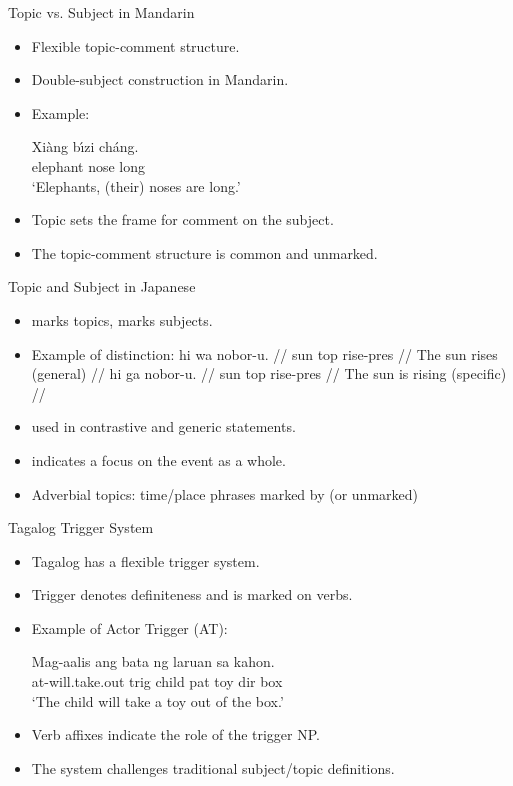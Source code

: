 \documentclass{beamer}
\begin{document}
\begin{frame}{Topic vs. Subject in Mandarin}
  \begin{itemize}
    \item Flexible topic-comment structure.
    \item Double-subject construction in Mandarin.
    \item Example:
    \begin{example}
    \gll Xiàng bı́zi cháng. \\
         elephant nose long \\
    \trans ‘Elephants, (their) noses are long.’
    \end{example}
    \item Topic sets the frame for comment on the subject.
    \item The topic-comment structure is common and unmarked.
  \end{itemize}
\end{frame}

\begin{frame}{Topic and Subject in Japanese}
  \begin{itemize}
    \item {} marks topics,  marks subjects.
    \item Example of  distinction:
      \ex
      \begingl
    \gla hi wa nobor-u. //
    \glb   sun top rise-pres //
    \glft The sun rises (general) //
    \endgl
    \xe
    \ex
          \begingl
    \gla hi ga nobor-u. //
     \glb     sun top rise-pres //
     \glft The sun is rising (specific) //
     \endgl
    \xe

    
    \item {} used in contrastive and generic statements.
    \item {} indicates a focus on the event as a whole.
    \item Adverbial topics: time/place phrases marked by  (or unmarked)
  \end{itemize}
\end{frame}

\begin{frame}{Tagalog Trigger System}
  \begin{itemize}
    \item Tagalog has a flexible trigger system.
    \item Trigger denotes definiteness and is marked on verbs.
    \item Example of Actor Trigger (AT):
    \begin{example}
    \gll Mag-aalis ang bata ng laruan sa kahon. \\
         at-will.take.out trig child pat toy dir box \\
    \trans ‘The child will take a toy out of the box.’
    \end{example}
    \item Verb affixes indicate the role of the trigger NP.
    \item The system challenges traditional subject/topic definitions.
  \end{itemize}
\end{frame}
\end{document}
